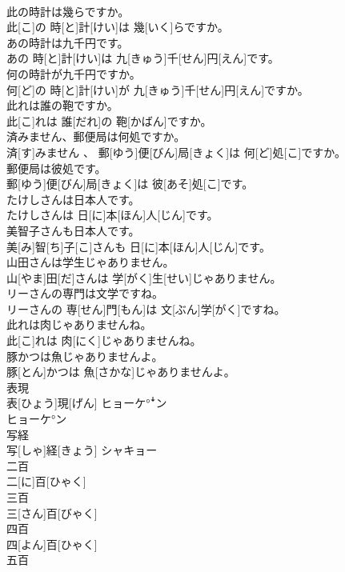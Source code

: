 \documentclass[8pt]{extreport}
\begin{document}
\begin{CJK}{UTF8}{min}
\\	此の時計は幾らですか。	
\\	此[こ]の 時[と]計[けい]は 幾[いく]らですか。
\\	あの時計は九千円です。	
\\	あの 時[と]計[けい]は 九[きゅう]千[せん]円[えん]です。
\\	何の時計が九千円ですか。	
\\	何[ど]の 時[と]計[けい]が 九[きゅう]千[せん]円[えん]ですか。
\\	此れは誰の鞄ですか。	
\\	此[こ]れは 誰[だれ]の 鞄[かばん]ですか。
\\	済みません、郵便局は何処ですか。	
\\	済[す]みません 、 郵[ゆう]便[びん]局[きょく]は 何[ど]処[こ]ですか。
\\	郵便局は彼処です。	
\\	郵[ゆう]便[びん]局[きょく]は 彼[あそ]処[こ]です。
\\	たけしさんは日本人です。	
\\	たけしさんは 日[に]本[ほん]人[じん]です。
\\	美智子さんも日本人です。	
\\	美[み]智[ち]子[こ]さんも 日[に]本[ほん]人[じん]です。
\\	山田さんは学生じゃありません。	
\\	山[やま]田[だ]さんは 学[がく]生[せい]じゃありません。
\\	リーさんの専門は文学ですね。	
\\	リーさんの 専[せん]門[もん]は 文[ぶん]学[がく]ですね。
\\	此れは肉じゃありませんね。	
\\	此[こ]れは 肉[にく]じゃありませんね。
\\	豚かつは魚じゃありませんよ。	
\\	豚[とん]かつは 魚[さかな]じゃありませんよ。
\\	表現	
\\	表[ひょう]現[げん]	ヒョーケ°ꜜン 
\\	ヒョーケ°ン
\\	写経	
\\	写[しゃ]経[きょう]	シャキョー
\\	二百	
\\	二[に]百[ひゃく]
\\	三百	
\\	三[さん]百[びゃく]
\\	四百	
\\	四[よん]百[ひゃく]	
\\	五百	

\end{CJK}
\end{document}
